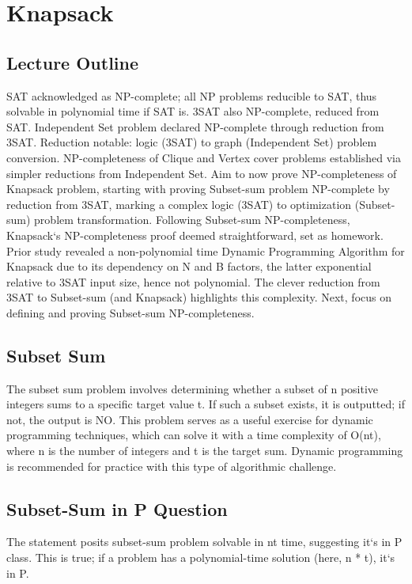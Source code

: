 \section*{Knapsack}

\subsection*{Lecture Outline}
SAT acknowledged as NP-complete; all NP problems reducible to SAT, thus solvable in polynomial time if SAT is.
3SAT also NP-complete, reduced from SAT\@.
Independent Set problem declared NP-complete through reduction from 3SAT\@.
Reduction notable: logic (3SAT) to graph (Independent Set) problem conversion.
NP-completeness of Clique and Vertex cover problems established via simpler reductions from Independent Set.
Aim to now prove NP-completeness of Knapsack problem, starting with proving Subset-sum problem NP-complete by reduction from 3SAT, marking a complex logic (3SAT) to optimization (Subset-sum) problem transformation.
Following Subset-sum NP-completeness, Knapsack`s NP-completeness proof deemed straightforward, set as homework.
Prior study revealed a non-polynomial time Dynamic Programming Algorithm for Knapsack due to its dependency on N and B factors, the latter exponential relative to 3SAT input size, hence not polynomial.
The clever reduction from 3SAT to Subset-sum (and Knapsack) highlights this complexity.
Next, focus on defining and proving Subset-sum NP-completeness.

\subsection*{Subset Sum}
The subset sum problem involves determining whether a subset of n positive integers sums to a specific target value t.
If such a subset exists, it is outputted; if not, the output is NO\@.
This problem serves as a useful exercise for dynamic programming techniques, which can solve it with a time complexity of O(nt), where n is the number of integers and t is the target sum.
Dynamic programming is recommended for practice with this type of algorithmic challenge.

\subsection*{Subset-Sum in P Question}
The statement posits subset-sum problem solvable in nt time, suggesting it`s in P class.
This is true; if a problem has a polynomial-time solution (here, n * t), it`s in P\@.


